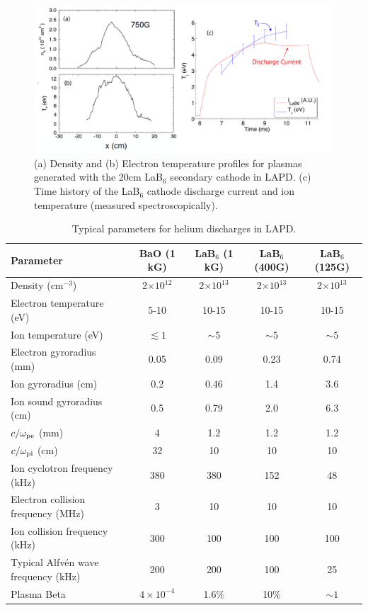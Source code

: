 \documentclass[11pt]{article}
\begin{document}
\begin{figure}[!htbp]
\centerline{\includegraphics[width=6.0truein]{lab6}}
\caption{(a) Density and (b) Electron temperature profiles for plasmas
generated with the 20cm LaB$_6$ secondary cathode in LAPD. (c) Time
history of the LaB$_6$ cathode discharge current and ion temperature
(measured spectroscopically).}\label{lab6}
\end{figure}

\begin{table}[!htbp]
{\begin{tabular}{|p{}|c|c|c|c|}
\hline \hline
Parameter & BaO (1 kG) & LaB$_6$ (1 kG) & LaB$_6$ (400G) & LaB$_6$ (125G) \\ \hline
\hline
Density (cm$^{-3}$) & 2$\times 10^{12}$ & 2$\times 10^{13}$ & 2$\times 10^{13}$ & 2$\times 10^{13}$ \\\hline
Electron temperature (eV) & 5-10 & 10-15 & 10-15 & 10-15 \\\hline
Ion temperature (eV) & $\lesssim 1$ & $\sim 5$ & $\sim 5$ & $\sim 5$ \\\hline
Electron gyroradius (mm) & 0.05 & 0.09 & 0.23 & 0.74 \\\hline
Ion gyroradius (cm) & 0.2 & 0.46 & 1.4  &  3.6 \\\hline
Ion sound gyroradius (cm) & 0.5 & 0.79 & 2.0 & 6.3 \\\hline
$c/\omega_{\rm pe}$ (mm) & 4 & 1.2 & 1.2 & 1.2 \\\hline
$c/\omega_{\rm pi}$ (cm) & 32 & 10 & 10 & 10 \\\hline
Ion cyclotron frequency (kHz) & 380 & 380 & 152 & 48 \\\hline
Electron collision frequency (MHz) & 3 &  10 & 10 & 10 \\\hline
Ion collision frequency (kHz)  &  300 & 100 & 100 & 100 \\\hline
Typical Alfv\'{e}n wave frequency (kHz) & 200 & 200 & 100 & 25 \\\hline
Plasma Beta  & $4\times 10^{-4}$ & 1.6\% & 10\% & $\sim 1$ \\\hline
\hline
\end{tabular}}
\caption{Typical parameters for helium discharges in
  LAPD. }\label{lapdparams}
\end{table}
\end{document}
